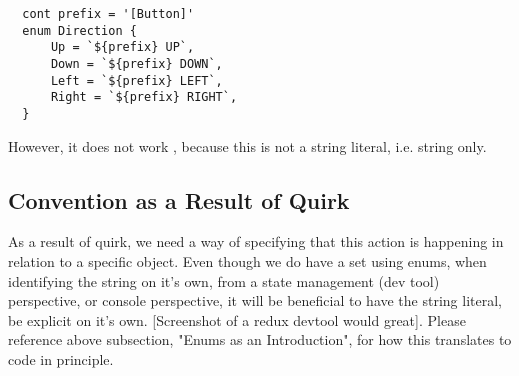 \begin{lstlisting}
  cont prefix = '[Button]'
  enum Direction {
      Up = `${prefix} UP`,
      Down = `${prefix} DOWN`,
      Left = `${prefix} LEFT`,
      Right = `${prefix} RIGHT`,
  }
\end{lstlisting}

However, it does not work , because this is not a string literal, i.e. string
only.

\subsection{ Convention as a Result of Quirk }
As a result of quirk, we need a way of specifying that this action is happening
in relation to a specific object. Even though we do have a set using enums,
when identifying the string on it's own, from a state management (dev tool)
perspective, or console perspective, it will be beneficial to have the string
literal, be explicit on it's own. [Screenshot of a redux devtool would great].
Please reference above subsection, "Enums as an Introduction", for how this
translates to code in principle.
